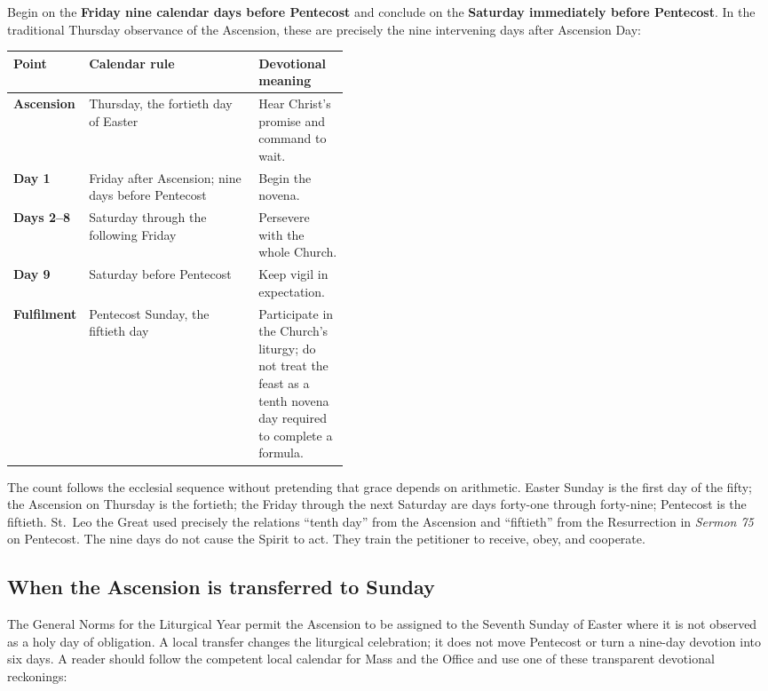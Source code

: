 Begin on the \textbf{Friday nine calendar days before Pentecost} and conclude on the \textbf{Saturday immediately before Pentecost}. In the traditional Thursday observance of the Ascension, these are precisely the nine intervening days after Ascension Day:

\begin{center}
\small
\begin{tabularx}{0.96\linewidth}{>{\bfseries}p{0.17\linewidth}X>{\raggedright\arraybackslash}p{0.27\linewidth}}
\toprule
Point & Calendar rule & Devotional meaning\\
\midrule
Ascension & Thursday, the fortieth day of Easter & Hear Christ's promise and command to wait.\\
Day 1 & Friday after Ascension; nine days before Pentecost & Begin the novena.\\
Days 2--8 & Saturday through the following Friday & Persevere with the whole Church.\\
Day 9 & Saturday before Pentecost & Keep vigil in expectation.\\
Fulfilment & Pentecost Sunday, the fiftieth day & Participate in the Church's liturgy; do not treat the feast as a tenth novena day required to complete a formula.\\
\bottomrule
\end{tabularx}
\end{center}

The count follows the ecclesial sequence without pretending that grace depends on arithmetic. Easter Sunday is the first day of the fifty; the Ascension on Thursday is the fortieth; the Friday through the next Saturday are days forty-one through forty-nine; Pentecost is the fiftieth. St.~Leo the Great used precisely the relations “tenth day” from the Ascension and “fiftieth” from the Resurrection in \textit{Sermon 75} on Pentecost. The nine days do not cause the Spirit to act. They train the petitioner to receive, obey, and cooperate.

\subsection{When the Ascension is transferred to Sunday}

The General Norms for the Liturgical Year permit the Ascension to be assigned to the Seventh Sunday of Easter where it is not observed as a holy day of obligation. A local transfer changes the liturgical celebration; it does not move Pentecost or turn a nine-day devotion into six days. A reader should follow the competent local calendar for Mass and the Office and use one of these transparent devotional reckonings:

